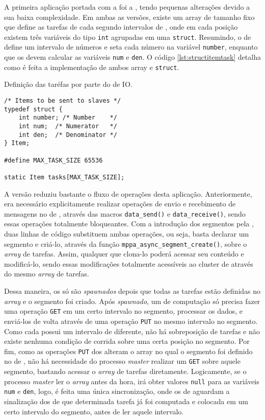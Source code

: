 A primeira aplicação portada com a \ASYNC foi a \FN, tendo pequenas alterações devido a sua baixa complexidade. Em ambas as versões, existe um array de tamanho fixo que define as tarefas de cada \cluster segundo intervalos de \offsets, onde em cada posição existem três variáveis do tipo \texttt{int} agrupadas em uma \texttt{struct}. Resumindo, o \cluster de \IO define um intervalo de números e seta cada número na variável \texttt{number}, enquanto que os \CCs devem calcular as variáveis \texttt{num} e \texttt{den}. O código \ref{lst:structitemtask} detalha como é feita a implementação de ambos array e \texttt{struct}.

\begin{listing}[h]
\caption{Definição das taréfas por  parte do \cluster de IO.}
\label{lst:structitemtask}
\begin{verbatim}
/* Items to be sent to slaves */
typedef struct {
    int number; /* Number    */
    int num;  /* Numerator   */
    int den;  /* Denominator */
} Item;    

#define MAX_TASK_SIZE 65536

static Item tasks[MAX_TASK_SIZE];
\end{verbatim}
\end{listing}

A versão \ASYNC reduziu bastante o fluxo de operações desta aplicação. Anteriormente, era necessário explicitamente realizar operações de envio e recebimento de mensagens no \cluster de \IO, através das macros \texttt{data\_send()} e \texttt{data\_receive()}, sendo essas operações totalmente bloqueantes. Com a introdução dos segmentos pela \API \ASYNC, duas linhas de código substituem ambas operações, ou seja, basta declarar um segmento e criá-lo, através da função \texttt{mppa\_async\_segment\_create()}, sobre o \textit{array} de tarefas. Assim, qualquer \CC que clona-lo poderá acessar seu conteúdo e modificá-lo, sendo essas modificações totalmente acessíveis ao cluster de \IO através do mesmo \textit{array} de tarefas.

Dessa maneira, os \CCs só são \textit{spawnados} depois que todas as tarefas estão definidas no \textit{array} e o segmento foi criado. Após \textit{spawnado}, um \cluster de computação só precisa fazer uma operação \texttt{GET} em um certo intervalo no segmento, processar os dados, e enviá-los de volta através de uma operação \texttt{PUT} no mesmo intervalo no segmento. Como cada \CC possui um intervalo de \offsets diferente, não há sobreposição de tarefas e não existe nenhuma condição de corrida sobre uma certa posição no segmento. Por fim, como as operações \texttt{PUT} dos \CCs alteram o array no qual o segmento foi definido no \cluster de \IO, não há necessidade do processo \textit{master} realizar um \texttt{GET} sobre aquele segmento, bastando acessar o \textit{array} de tarefas diretamente. Logicamente, se o processo \textit{master} ler o \textit{array} antes da hora, irá obter valores \texttt{null} para as variáveis \texttt{num} e \texttt{den}, logo, é feita uma única sincronização, onde os \clusters de \IO aguardam a sinalização dos \CCs de que determinada tarefa já foi computada e colocada em um certo intervalo do segmento, antes de ler aquele intervalo.

